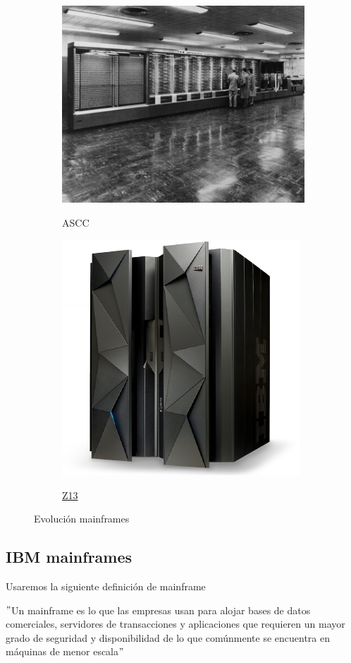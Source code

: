 \documentclass[paper=a4, fontsize=10pt]{scrartcl} %
\numberwithin{equation}{section} %
\numberwithin{figure}{section} %
\numberwithin{table}{section} %
\begin{document}
\begin{figure}[H]
	\centering
	\begin{subfigure}{.5\textwidth}
		\centering
		\href{https://www-03.ibm.com/ibm/history/exhibits/markI/markI_intro.html}{		\includegraphics[width=.75\linewidth]{./Imagenes/ascc.jpg}}
		\caption{ASCC}
		\label{fig:ascc}
	\end{subfigure}%
	\begin{subfigure}{.5\textwidth}
		\centering
		\href{https://www-03.ibm.com/systems/z/hardware/z13.html}{\includegraphics[width=.75\linewidth]{./Imagenes/z13.jpg}}
		\caption{\href{https://www-03.ibm.com/systems/z/}{Z13}}
		\label{fig:z13}
	\end{subfigure}
	\caption{Evolución mainframes}
\end{figure}



\subsection{IBM mainframes}
Usaremos la siguiente definición de mainframe \cite{ibm-mainframes}
\begin{center}
	$"$Un mainframe es lo que las empresas usan para alojar bases de datos comerciales, servidores de transacciones y aplicaciones que requieren un mayor grado de seguridad y disponibilidad de lo que comúnmente se encuentra en máquinas de menor escala$"$ 
\end{center}
\end{document}

